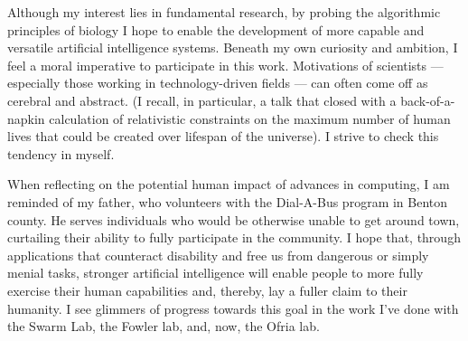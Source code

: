 Although my interest lies in fundamental research, by probing the algorithmic principles of biology I hope to enable the development of more capable and versatile artificial intelligence systems.
Beneath my own curiosity and ambition, I feel a moral imperative to participate in this work.
Motivations of scientists --- especially those working in technology-driven fields --- can often come off as cerebral and abstract.
(I recall, in particular, a talk that closed with a back-of-a-napkin calculation of relativistic constraints on the maximum number of human lives that could be created over lifespan of the universe).
I strive to check this tendency in myself.

When reflecting on the potential human impact of advances in computing, I am reminded of my father, who volunteers with the Dial-A-Bus program in Benton county.
He serves individuals who would be otherwise unable to get around town, curtailing their ability to fully participate in the community.
I hope that, through applications that counteract disability and free us from dangerous or simply menial tasks, stronger artificial intelligence will enable people to more fully exercise their human capabilities and, thereby, lay a fuller claim to their humanity.
I see glimmers of progress towards this goal in the work I've done with the Swarm Lab, the Fowler lab, and, now, the Ofria lab.

